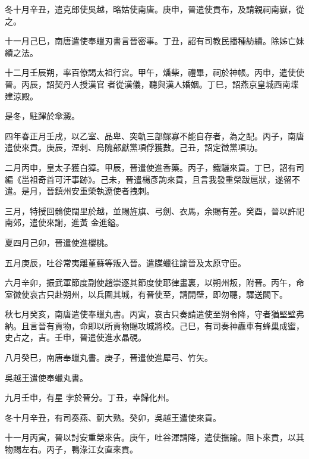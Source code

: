 \begin{pinyinscope}
 冬十月辛丑，遣克郎使吳越，略姑使南唐。庚申，晉遣使貢布，及請親祠南嶽，從之。



 十一月己巳，南唐遣使奉蠟刃書言晉密事。丁丑，詔有司教民播種紡績。除姊亡妹績之法。



 十二月壬辰朔，率百僚謁太祖行宮。甲午，燔柴，禮畢，祠於神帳。丙申，遣使使晉。丙辰，詔契丹人授漢官
 者從漢儀，聽與漢人婚姻。丁巳，詔燕京皇城西南堞建涼殿。



 是冬，駐蹕於傘澱。



 四年春正月壬戌，以乙室、品卑、突軌三部鰥寡不能自存者，為之配。丙子，南唐遣使來貢。庚辰，涅刺、烏隗部獻黨項俘獲數。己丑，詔定徵黨項功。



 二月丙申，皇太子獲白獐。甲辰，晉遣使進香藥。丙子，鐵驪來貢。丁巳，詔有司編《邕祖奇首可汗事跡》。己未，晉遣楊彥詢來貢，且言我發重榮跋扈狀，遂留不遣。是月，晉鎮州安重榮執遼使者拽刺。



 三月，特授回鶻使闊里於越，並賜旌旗、弓劍、衣馬，余賜有差。癸酉，晉以許祀南郊，遣使來謝，進黃
 金進鎰。



 夏四月己卯，晉遣使進櫻桃。



 五月庚辰，吐谷常夷離堇蘇等叛入晉。遣牒蠟往諭晉及太原守臣。



 六月辛卯，振武軍節度副使趙崇逐其節度使耶律畫裏，以朔州叛，附晉。丙午，命室徽使哀古只赴朔州，以兵圍其城，有晉使至，請開壁，即勿聽，驛送闕下。



 秋七月癸亥，南唐遣使奉蠟丸書。丙寅，哀古只奏請遣使至朔令降，守者猶堅壁弗納。且言晉有貢物，命即以所貢物賜攻城將校。己巳，有司奏神纛車有蜂巢成蜜，史占之，吉。壬申，晉遣使進水晶硯。



 八月癸巳，南唐奉蠟丸書。庚子，晉遣使進犀弓、竹矢。



 吳越王遣使奉蠟丸書。



 九月壬申，有星
 孛於晉分。丁丑，幸歸化州。



 冬十月辛丑，有司奏燕、薊大熟。癸卯，吳越王遣使來貢。



 十一月丙寅，晉以討安重榮來告。庚午，吐谷渾請降，遣使撫諭。阻卜來貢，以其物賜左右。丙子，鴨淥江女直來貢。




\end{pinyinscope}
